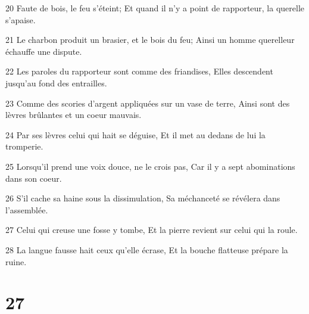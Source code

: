 \par 20 Faute de bois, le feu s'éteint; Et quand il n'y a point de rapporteur, la querelle s'apaise.
\par 21 Le charbon produit un brasier, et le bois du feu; Ainsi un homme querelleur échauffe une dispute.
\par 22 Les paroles du rapporteur sont comme des friandises, Elles descendent jusqu'au fond des entrailles.
\par 23 Comme des scories d'argent appliquées sur un vase de terre, Ainsi sont des lèvres brûlantes et un coeur mauvais.
\par 24 Par ses lèvres celui qui hait se déguise, Et il met au dedans de lui la tromperie.
\par 25 Lorsqu'il prend une voix douce, ne le crois pas, Car il y a sept abominations dans son coeur.
\par 26 S'il cache sa haine sous la dissimulation, Sa méchanceté se révélera dans l'assemblée.
\par 27 Celui qui creuse une fosse y tombe, Et la pierre revient sur celui qui la roule.
\par 28 La langue fausse hait ceux qu'elle écrase, Et la bouche flatteuse prépare la ruine.

\chapter{27}

